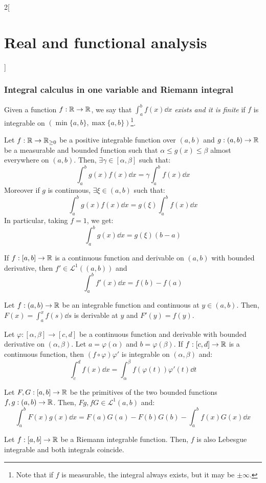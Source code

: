 \documentclass[../../../main_math.tex]{subfiles}
\begin{document}
\begin{multicols}{2}[\section{Real and functional analysis}]
  \subsubsection{Integral calculus in one variable and Riemann integral}
  \begin{definition}
    Given a function $f:\mathbb{R}\rightarrow\mathbb{R}$, we say that $\int_a^bf(x)\dd{x}$ \emph{exists and it is finite} if $f$ is integrable on $(\min\{a,b\},\max\{a,b\})$\footnote{Note that if $f$ is measurable, the integral always exists, but it may be $\pm\infty$.}.
  \end{definition}
  \begin{theorem}
    Let $f:\mathbb{R}\rightarrow\mathbb{R}_{\geq 0}$ be a positive integrable function over $(a,b)$ and $g:(a,b)\rightarrow\mathbb{R}$ be a measurable and bounded function such that $\alpha\leq g(x)\leq\beta$ almost everywhere on $(a,b)$. Then, $\exists\gamma\in[\alpha,\beta]$ such that: $$\int_a^bg(x)f(x)\dd{x}=\gamma\int_a^bf(x)\dd{x}$$
    Moreover if $g$ is continuous, $\exists\xi\in(a,b)$ such that: $$\int_a^bg(x)f(x)\dd{x}=g(\xi)\int_a^bf(x)\dd{x}$$
    In particular, taking $f=1$, we get:  $$\int_a^bg(x)\dd{x}=g(\xi)(b-a)$$
  \end{theorem}
  \begin{theorem}
    If $f:[a,b]\rightarrow\mathbb{R}$ is a continuous function and derivable on $(a,b)$ with bounded derivative, then $f'\in \mathcal{L}^1((a,b))$ and $$\int_a^bf'(x)\dd{x}=f(b)-f(a)$$
  \end{theorem}
  \begin{theorem}
    Let $f:(a,b)\rightarrow\mathbb{R}$ be an integrable function and continuous at $y\in (a,b)$. Then, $F(x)=\int_a^xf(s)\dd{s}$ is derivable at $y$ and $F'(y)=f(y)$.
  \end{theorem}
  \begin{theorem}
    Let $\varphi:[\alpha,\beta]\rightarrow[c,d]$ be a continuous function and derivable with bounded derivative on $(\alpha,\beta)$. Let $a=\varphi(\alpha)$ and $b=\varphi(\beta)$. If $f:[c,d]\rightarrow\mathbb{R}$ is a continuous function, then $(f\circ\varphi)\varphi'$ is integrable on $(\alpha,\beta)$ and: $$\int_c^df(x)\dd{x}=\int_\alpha^\beta f(\varphi(t))\varphi'(t)\dd{t}$$
  \end{theorem}
  \begin{theorem}
    Let $F,G:[a,b]\rightarrow\mathbb{R}$ be the primitives of the two bounded functions $f,g:(a,b)\rightarrow\mathbb{R}$. Then, $Fg,fG\in \mathcal{L}^1(a,b)$ and: $$\int_a^bF(x)g(x)\dd{x}=F(a)G(a)-F(b)G(b)-\int_a^bf(x)G(x)\dd{x}$$
  \end{theorem}
  \begin{theorem}
    Let $f:[a,b]\rightarrow\mathbb{R}$ be a Riemann integrable function. Then, $f$ is also Lebesgue integrable and both integrals coincide.
  \end{theorem}

\end{multicols}
\end{document}
